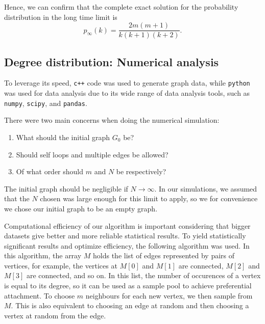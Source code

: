 Hence, we can confirm that the complete exact solution for the probability distribution in the long time limit is 
\begin{equation}
	p_{\infty}(k) = \frac{2m(m+1)}{k(k+1)(k+2)}.
	\label{eq:p-infinity-solution}
\end{equation}

\subsection{Degree distribution: Numerical analysis}\label{subsection:ppa-numerical-analysis}

To leverage its speed, \texttt{c++} code was used to generate graph data, while \texttt{python} was used for data analysis due to its wide range of data analysis tools, such as \texttt{numpy}, \texttt{scipy}, and \texttt{pandas}. 

There were two main concerns when doing the numerical simulation:

\begin{enumerate}
	\item What should the initial graph $G_0$ be? 
	\item Should self loops and multiple edges be allowed?
	\item Of what order should $m$ and $N$ be respectively?
\end{enumerate}

The initial graph should be negligible if $N \rightarrow \infty$. In our simulations, we assumed that the $N$ chosen was large enough for this limit to apply, so we for convenience we chose our initial graph to be an empty graph. 

Computational efficiency of our algorithm is important considering that bigger datasets give better and more reliable statistical results. To yield statistically significant results and optimize efficiency, the following algorithm was used. In this algorithm, the array $M$ holds the list of edges represented by pairs of vertices, for example, the vertices at $M[0]$ and $M[1]$ are connected, $M[2]$ and $M[3]$ are connected, and so on. In this list, the number of occurences of a vertex is equal to its degree, so it can be used as a sample pool to achieve preferential attachment. To choose $m$ neighbours for each new vertex, we then sample from $M$. This is also equivalent to choosing an edge at random and then choosing a vertex at random from the edge. 

